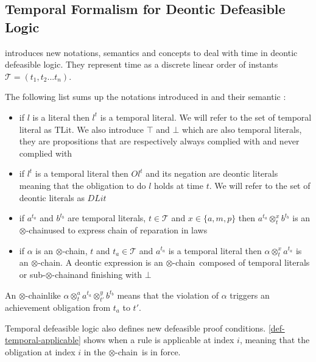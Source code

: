 \documentclass[10pt]{report}
\newcommand{\ochain}{$\otimes$-chain}
\begin{document}

\subsection{Temporal Formalism for Deontic Defeasible Logic}

\autocite{JusticeDelayed2011} introduces new notations, semantics and concepts to deal with time in deontic defeasible logic. They represent time as a discrete linear order of instants $ \mathscr{T} = (t_{1}, t_{2} ... t_{n})$.

The following list sums up the notations introduced in \autocite{JusticeDelayed2011} and their semantic :
\begin{itemize}
\item if $l$ is a literal then $l^{t}$ is a temporal literal. We will refer to the set of temporal literal as $\text{TLit}$. We also introduce $\top$ and $\bot$ which are also temporal literals, they are propositions that are respectively always complied with and never complied with
\item if $l^{t}$ is a temporal literal then $Ol^{t}$ and its negation are deontic literals meaning that the obligation to do $l$ holds at time $t$. We will refer to the set of deontic literals as $DLit$
\item if $a^{t_{a}}$ and $b^{t_{b}}$ are temporal literals, $t \in \mathscr{T}$ and $x \in \{a,m,p\}$ then $a^{t_{a}} \otimes^{x}_{t} b^{t_{b}}$ is an \ochain used to express chain of reparation in laws
\item if $\alpha$ is an \ochain, $t$ and $t_a \in \mathscr{T}$  and $a^{t_{a}}$ is a temporal literal then $\alpha \otimes^x_t a^{t_{a}}$ is an \ochain . A deontic expression is an \ochain\ composed of temporal literals or sub-\ochain and finishing with $\bot$
\end{itemize} 


An \ochain like $\alpha \otimes^{a}_{t} a^{t_{a}} \otimes^{y}_{t'} b^{t_{b}}$ means that the violation of $\alpha$ triggers an achievement obligation from $t_{a}$ to $t'$.

Temporal defeasible logic also defines new defeasible proof conditions. \ref{def-temporal-applicable} shows when a rule is applicable at index $i$, meaning that the obligation at index $i$ in the \ochain\ is in force.
\end{document}
